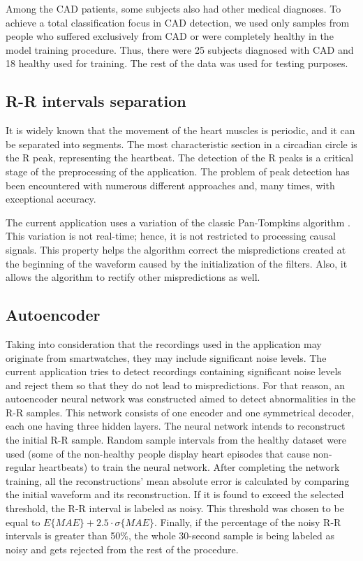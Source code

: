 Among the CAD patients, some subjects also had other medical diagnoses. To achieve a total classification focus in CAD detection, we used only samples from people who suffered exclusively from CAD or were completely healthy in the model training procedure. Thus, there were 25 subjects diagnosed with CAD and 18 healthy used for training. The rest of the data was used for testing purposes. 

\subsection{R-R intervals separation}
\label{ssec:RR_intervals_separation}

It is widely known that the movement of the heart muscles is periodic, and it can be separated into segments. The most characteristic section in a circadian circle is the R peak, representing the heartbeat. The detection of the R peaks is a critical stage of the preprocessing of the application. The problem of peak detection has been encountered with numerous different approaches and, many times, with exceptional accuracy. 

The current application uses a variation of the classic Pan-Tompkins algorithm \cite{pan_tompkins, pan_tompkins_matlab}. This variation is not real-time; hence, it is not restricted to processing causal signals. This property helps the algorithm correct the mispredictions created at the beginning of the waveform caused by the initialization of the filters. Also, it allows the algorithm to rectify other mispredictions as well.

\subsection{Autoencoder}
\label{ssec:autoencoder}

Taking into consideration that the recordings used in the application may originate from smartwatches, they may include significant noise levels.
The current application tries to detect recordings containing significant noise levels and reject them so that they do not lead to mispredictions. For that reason, an autoencoder neural network was constructed aimed to detect abnormalities in the R-R samples. This network consists of one encoder and one symmetrical decoder, each one having three hidden layers. The neural network intends to reconstruct the initial R-R sample. Random sample intervals from the healthy dataset were used (some of the non-healthy people display heart episodes that cause non-regular heartbeats) to train the neural network. After completing the network training, all the reconstructions' mean absolute error is calculated by comparing the initial waveform and its reconstruction. If it is found to exceed the selected threshold, the R-R interval is labeled as noisy. This threshold was chosen to be equal to $E\{MAE\} + 2.5 \cdot\sigma\{MAE\}$. Finally, if the percentage of the noisy R-R intervals is greater than 50\%, the whole 30-second sample is being labeled as noisy and gets rejected from the rest of the procedure.

